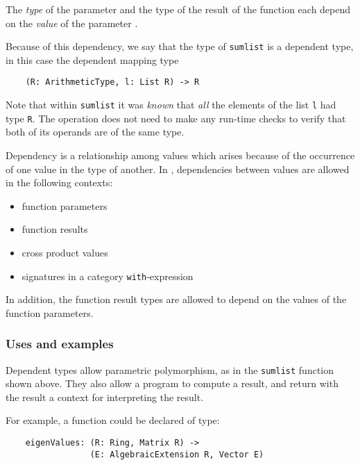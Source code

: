 The {\em type\/} of the parameter  and the type of the result
of the function each depend on the {\em value\/} of the parameter .

Because of this dependency, we say that the type of \verb"sumlist" is a 
dependent type, in this case the dependent mapping type

\begin{small}
\begin{verbatim}
    (R: ArithmeticType, l: List R) -> R
\end{verbatim}
\end{small}

Note that within \verb"sumlist" it was {\em known\/} that {\em all\/}
the elements of the list \verb"l" had type \verb"R".  
The \ttin{+} operation does not need to make any run-time checks
to verify that both of its operands are of the same type.

Dependency is a relationship among values which arises because of the
occurrence of one value in the type of another.
In \asharp{}, dependencies between values are allowed in the following
contexts:
\begin{itemize}
\item function parameters
\item function results
\item cross product values
\item signatures in a category {\tt with}-expression
\end{itemize}
In addition, the function result types are allowed to depend on the
values of the function parameters.

\subsubsection{Uses and examples}

Dependent types allow parametric polymorphism, as in the
\verb"sumlist" function shown above.  
They also allow a program to compute a result, and return with the
result a context for interpreting the result.

For example, a function could be declared of type:

\begin{small}
\begin{verbatim}
    eigenValues: (R: Ring, Matrix R) ->
                 (E: AlgebraicExtension R, Vector E)
\end{verbatim}
\end{small}

